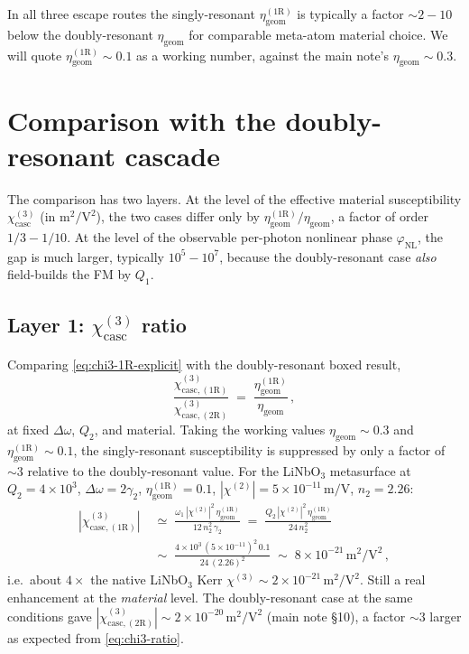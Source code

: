 \documentclass[11pt,a4paper]{article}
\newcommand{\chitwo}{\chi^{(2)}}
\newcommand{\chithree}{\chi^{(3)}}
\newcommand{\Dom}{\Delta\omega}
\newcommand{\chicascOneR}{\chi^{(3)}_{\text{casc},(1\mathrm R)}}
\newcommand{\chicascTwoR}{\chi^{(3)}_{\text{casc},(2\mathrm R)}}
\begin{document}
In all three escape routes the singly-resonant
$\eta_\text{geom}^{(1\mathrm R)}$ is typically a factor $\sim 2\!-\!10$
below the doubly-resonant $\eta_\text{geom}$ for comparable meta-atom
material choice.  We will quote $\eta_\text{geom}^{(1\mathrm R)}\sim 0.1$
as a working number, against the main note's
$\eta_\text{geom}\sim 0.3$.

\section{Comparison with the doubly-resonant cascade}\label{sec:compare}

The comparison has two layers.  At the level of the effective material
susceptibility $\chithree_\text{casc}$ (in $\mathrm{m}^{2}/\mathrm{V}^{2}$),
the two cases differ only by $\eta_\text{geom}^{(1\mathrm R)}/\eta_\text{geom}$,
a factor of order $1/3\!-\!1/10$.  At the level of the observable
per-photon nonlinear phase $\varphi_\text{NL}$, the gap is much larger,
typically $10^{5}\!-\!10^{7}$, because the doubly-resonant case
\emph{also} field-builds the FM by $Q_1$.

\subsection*{Layer 1: \texorpdfstring{$\chithree_\text{casc}$}{χ³\_casc} ratio}

Comparing \eqref{eq:chi3-1R-explicit} with the doubly-resonant boxed result,
\begin{equation}
  \frac{\chicascOneR}{\chicascTwoR}
   \;=\;\frac{\eta_\text{geom}^{(1\mathrm R)}}{\eta_\text{geom}}\,,
  \label{eq:chi3-ratio}
\end{equation}
at fixed $\Dom$, $Q_2$, and material.  Taking the working values
$\eta_\text{geom}\sim 0.3$ and $\eta_\text{geom}^{(1\mathrm R)}\sim 0.1$,
the singly-resonant susceptibility is suppressed by only a factor of
$\sim 3$ relative to the doubly-resonant value.  For the LiNbO$_3$
metasurface at $Q_2=4\!\times\!10^{3}$, $\Dom=2\gamma_2$,
$\eta_\text{geom}^{(1\mathrm R)}=0.1$, $|\chitwo|=5\!\times\!10^{-11}\,
\mathrm{m/V}$, $n_2=2.26$:
\begin{align}
  |\chicascOneR|
   &\;\simeq\;\frac{\omega_1\,|\chitwo|^{2}\,\eta_\text{geom}^{(1\mathrm R)}}
                  {12\,n_2^{2}\,\gamma_2}
   \;=\;\frac{Q_2\,|\chitwo|^{2}\,\eta_\text{geom}^{(1\mathrm R)}}{24\,n_2^{2}}\nonumber\\[2pt]
   &\;\sim\;\frac{4\times 10^{3}\,(5\!\times\!10^{-11})^{2}\,0.1}
                  {24\,(2.26)^{2}}
   \;\sim\;8\times 10^{-21}\,\mathrm{m^{2}/V^{2}}\,,
\end{align}
i.e.\ about $4\times$ the native LiNbO$_3$ Kerr $\chithree\sim
2\times 10^{-21}\,\mathrm{m^{2}/V^{2}}$.  Still a real enhancement at the
\emph{material} level.  The doubly-resonant case at the same conditions
gave $|\chicascTwoR|\sim 2\!\times\!10^{-20}\,
\mathrm{m^{2}/V^{2}}$ (main note \S 10), a factor $\sim 3$ larger as
expected from \eqref{eq:chi3-ratio}.
\end{document}
